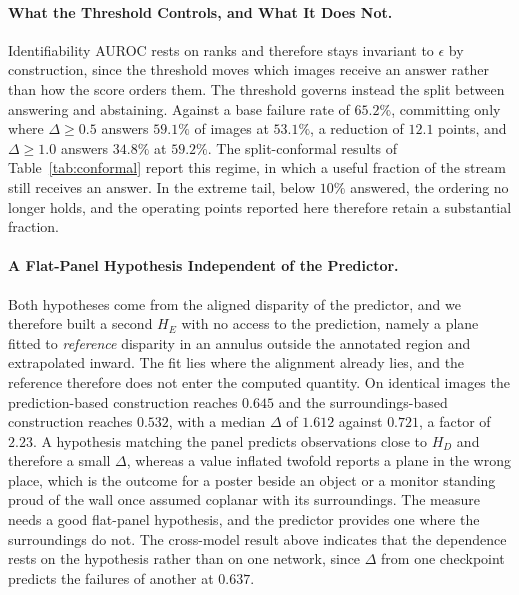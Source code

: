 \documentclass{article} %
\theoremstyle{defstyle}
\theoremstyle{plain}
\begin{document}
\paragraph{What the Threshold Controls, and What It Does Not.}
Identifiability AUROC rests on ranks and therefore stays invariant to $\epsilon$ by
construction, since the threshold moves which images receive an answer rather than how the
score orders them. The threshold governs instead the split between answering and abstaining.
Against a base failure rate of $65.2\%$, committing only where $\Delta \geq 0.5$ answers
$59.1\%$ of images at $53.1\%$, a reduction of $12.1$ points, and $\Delta \geq 1.0$ answers
$34.8\%$ at $59.2\%$. The split-conformal results of Table~\ref{tab:conformal} report this
regime, in which a useful fraction of the stream still receives an answer. In the extreme
tail, below $10\%$ answered, the ordering no longer holds, and the operating points reported
here therefore retain a substantial fraction.

\paragraph{A Flat-Panel Hypothesis Independent of the Predictor.}
Both hypotheses come from the aligned disparity of the predictor, and we therefore built a
second $H_E$ with no access to the prediction, namely a plane fitted to \emph{reference}
disparity in an annulus outside the annotated region and extrapolated inward. The fit lies
where the alignment already lies, and the reference therefore does not enter the computed
quantity. On identical images the prediction-based construction reaches $0.645$ and the
surroundings-based construction reaches $0.532$, with a median $\Delta$ of $1.612$ against
$0.721$, a factor of $2.23$. A hypothesis matching the panel predicts observations close to
$H_D$ and therefore a small $\Delta$, whereas a value inflated twofold reports a plane in the
wrong place, which is the outcome for a poster beside an object or a monitor standing proud
of the wall once assumed coplanar with its surroundings. The measure needs a good flat-panel
hypothesis, and the predictor provides one where the surroundings do not. The cross-model
result above indicates that the dependence rests on the hypothesis rather than on one
network, since $\Delta$ from one checkpoint predicts the failures of another at $0.637$.
\end{document}
